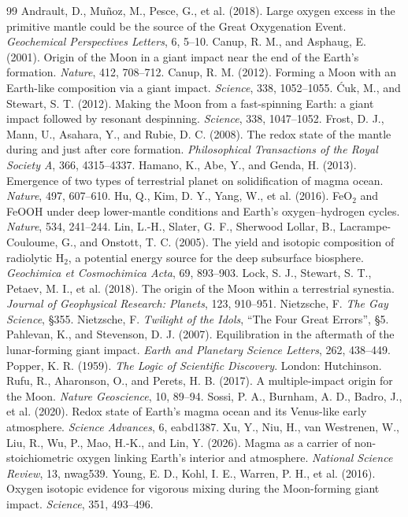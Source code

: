 \documentclass[11pt]{article}
\begin{document}
\begin{thebibliography}{99}
 Andrault, D., Mu\~noz, M., Pesce, G., et al. (2018). Large oxygen excess in the primitive mantle could be the source of the Great Oxygenation Event. \emph{Geochemical Perspectives Letters}, 6, 5--10.
 Canup, R. M., and Asphaug, E. (2001). Origin of the Moon in a giant impact near the end of the Earth's formation. \emph{Nature}, 412, 708--712.
 Canup, R. M. (2012). Forming a Moon with an Earth-like composition via a giant impact. \emph{Science}, 338, 1052--1055.
 \'Cuk, M., and Stewart, S. T. (2012). Making the Moon from a fast-spinning Earth: a giant impact followed by resonant despinning. \emph{Science}, 338, 1047--1052.
 Frost, D. J., Mann, U., Asahara, Y., and Rubie, D. C. (2008). The redox state of the mantle during and just after core formation. \emph{Philosophical Transactions of the Royal Society A}, 366, 4315--4337.
 Hamano, K., Abe, Y., and Genda, H. (2013). Emergence of two types of terrestrial planet on solidification of magma ocean. \emph{Nature}, 497, 607--610.
 Hu, Q., Kim, D. Y., Yang, W., et al. (2016). FeO$_2$ and FeOOH under deep lower-mantle conditions and Earth's oxygen--hydrogen cycles. \emph{Nature}, 534, 241--244.
 Lin, L.-H., Slater, G. F., Sherwood Lollar, B., Lacrampe-Couloume, G., and Onstott, T. C. (2005). The yield and isotopic composition of radiolytic H$_2$, a potential energy source for the deep subsurface biosphere. \emph{Geochimica et Cosmochimica Acta}, 69, 893--903.
 Lock, S. J., Stewart, S. T., Petaev, M. I., et al. (2018). The origin of the Moon within a terrestrial synestia. \emph{Journal of Geophysical Research: Planets}, 123, 910--951.
 Nietzsche, F. \emph{The Gay Science}, \S355.
 Nietzsche, F. \emph{Twilight of the Idols}, ``The Four Great Errors'', \S5.
 Pahlevan, K., and Stevenson, D. J. (2007). Equilibration in the aftermath of the lunar-forming giant impact. \emph{Earth and Planetary Science Letters}, 262, 438--449.
 Popper, K. R. (1959). \emph{The Logic of Scientific Discovery}. London: Hutchinson.
 Rufu, R., Aharonson, O., and Perets, H. B. (2017). A multiple-impact origin for the Moon. \emph{Nature Geoscience}, 10, 89--94.
 Sossi, P. A., Burnham, A. D., Badro, J., et al. (2020). Redox state of Earth's magma ocean and its Venus-like early atmosphere. \emph{Science Advances}, 6, eabd1387.
 Xu, Y., Niu, H., van Westrenen, W., Liu, R., Wu, P., Mao, H.-K., and Lin, Y. (2026). Magma as a carrier of non-stoichiometric oxygen linking Earth's interior and atmosphere. \emph{National Science Review}, 13, nwag539.
 Young, E. D., Kohl, I. E., Warren, P. H., et al. (2016). Oxygen isotopic evidence for vigorous mixing during the Moon-forming giant impact. \emph{Science}, 351, 493--496.
\end{thebibliography}
\end{document}
